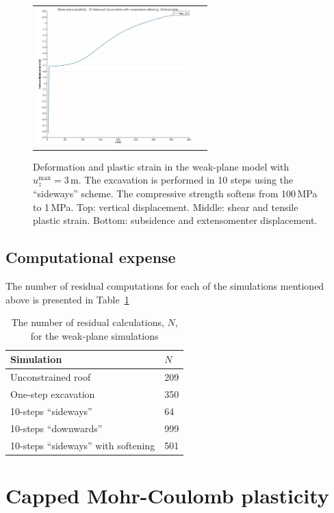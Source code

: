 \documentclass[]{scrreprt}
\begin{document}
\begin{figure}[p]
\begin{center}
\begin{tabular}{cc}
\includegraphics[width=6cm]{wp_only_10_sideways_soften_extensometer.pdf}
\end{tabular}
\caption{Deformation and plastic strain in the weak-plane model with
  $u_{z}^{\mathrm{max}} = 3$\,m.  The excavation is performed in 10
  steps using the ``sideways'' scheme.  The compressive strength
  softens from 100\,MPa to 1\,MPa.  Top:
  vertical displacement.  Middle: shear and tensile plastic strain.
  Bottom: subsidence and extensomenter displacement.}
\label{wp.10_sideways_soften_soften}
\end{center}
\end{figure}

\section{Computational expense}

The number of residual computations for each of the simulations
mentioned above is presented in Table~\ref{wp.n}

\begin{table}[htb]
\begin{center}
\begin{tabular}{ll}
Simulation & $N$ \\
\hline
Unconstrained roof & 209 \\
One-step excavation & 350 \\
10-steps ``sideways'' & 64 \\
10-steps ``downwards'' & 999 \\
10-steps ``sideways'' with softening & 501
\end{tabular}
\caption{The number of residual calculations, $N$, for the weak-plane
  simulations}
\label{wp.n}
\end{center}
\end{table}


\chapter{Capped Mohr-Coulomb plasticity}
\label{mc.chap}
\end{document}
